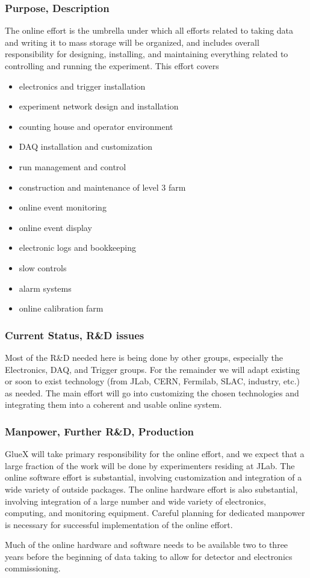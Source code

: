 \subsubsection*{Purpose, Description}

The online effort is the umbrella under which all efforts related to
taking data and writing it to mass storage will be organized, and
includes overall responsibility for designing, installing, and
maintaining everything related to controlling and running the
experiment.  This effort covers
\begin{itemize}
\item electronics and trigger installation
\item experiment network design and installation
\item counting house and operator environment
\item DAQ installation and customization
\item run management and control
\item construction and maintenance of level 3 farm
\item online event monitoring 
\item online event display
\item electronic logs and bookkeeping
\item slow controls
\item alarm systems
\item online calibration farm
\end{itemize}


\subsubsection*{Current Status, R\&D issues}

Most of the R\&D needed here is being done by other groups, especially
the Electronics, DAQ, and Trigger groups.  For the remainder we will
adapt existing or soon to exist technology (from JLab, CERN, Fermilab,
SLAC, industry, etc.) as needed.  The main effort will go into
customizing the chosen technologies and integrating them into a
coherent and usable online system.



\subsubsection*{Manpower, Further R\&D, Production}

GlueX will take primary responsibility for the online effort, and we
expect that a large fraction of the work will be done by experimenters
residing at JLab.  The online software effort is substantial,
involving customization and integration of a wide variety of outside
packages.  The online hardware effort is also substantial, involving
integration of a large number and wide variety of electronics,
computing, and monitoring equipment.  Careful planning for dedicated
manpower is necessary for successful implementation of the online
effort.

Much of the online hardware and software needs to be available two to
three years before the beginning of data taking to allow for detector
and electronics commissioning.
